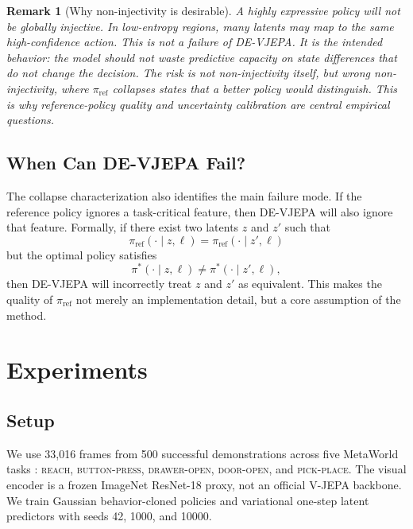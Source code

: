 \documentclass[10pt,twocolumn]{article}
\theoremstyle{tightstyle}
\newtheorem{remark}{Remark}
\begin{document}
\begin{remark}[Why non-injectivity is desirable]
A highly expressive policy will not be globally injective.
In low-entropy regions, many latents may map to the same high-confidence action.
This is not a failure of DE-VJEPA.
It is the intended behavior: the model should not waste predictive capacity on
state differences that do not change the decision.
The risk is not non-injectivity itself, but \emph{wrong} non-injectivity, where
$\pi_{\mathrm{ref}}$ collapses states that a better policy would distinguish.
This is why reference-policy quality and uncertainty calibration are central
empirical questions.
\end{remark}

\subsection{When Can DE-VJEPA Fail?}

The collapse characterization also identifies the main failure mode.
If the reference policy ignores a task-critical feature, then DE-VJEPA will also
ignore that feature.
Formally, if there exist two latents $z$ and $z'$ such that
\[
  \pi_{\mathrm{ref}}(\cdot \mid z,\ell)
  =
  \pi_{\mathrm{ref}}(\cdot \mid z',\ell)
\]
but the optimal policy satisfies
\[
  \pi^*(\cdot \mid z,\ell)
  \neq
  \pi^*(\cdot \mid z',\ell),
\]
then DE-VJEPA will incorrectly treat $z$ and $z'$ as equivalent.
This makes the quality of $\pi_{\mathrm{ref}}$ not merely an implementation detail,
but a core assumption of the method.

\section{Experiments}
\label{sec:experiments}

\subsection{Setup}

We use 33,016 frames from 500 successful demonstrations across five MetaWorld
tasks \citep{yu2020metaworld}: \textsc{reach}, \textsc{button-press},
\textsc{drawer-open}, \textsc{door-open}, and \textsc{pick-place}.
The visual encoder is a frozen ImageNet ResNet-18 proxy, not an official V-JEPA
backbone. We train Gaussian behavior-cloned policies and variational one-step
latent predictors with seeds 42, 1000, and 10000.
\end{document}

